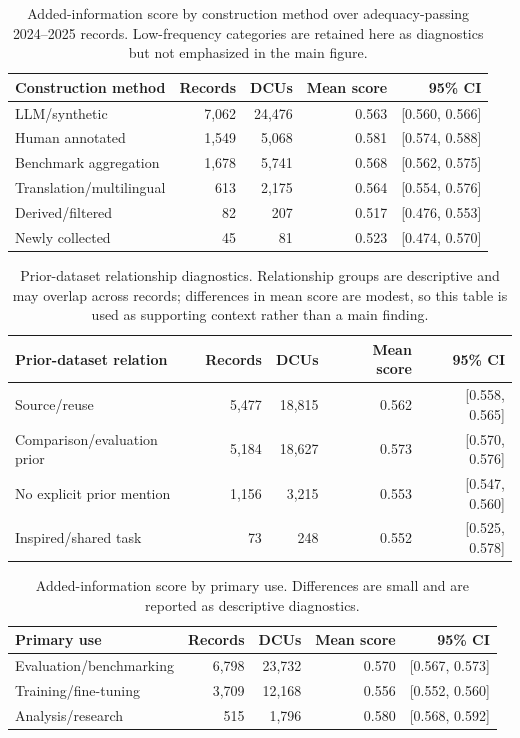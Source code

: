\documentclass[11pt]{article}
\begin{document}
\begin{table}[h]
\centering
\small
\setlength{\tabcolsep}{4pt}
\begin{tabular}{lrrrr}
\toprule
Construction method & Records & DCUs & Mean score & 95\% CI \\
\midrule
LLM/synthetic & 7,062 & 24,476 & 0.563 & [0.560, 0.566] \\
Human annotated & 1,549 & 5,068 & 0.581 & [0.574, 0.588] \\
Benchmark aggregation & 1,678 & 5,741 & 0.568 & [0.562, 0.575] \\
Translation/multilingual & 613 & 2,175 & 0.564 & [0.554, 0.576] \\
Derived/filtered & 82 & 207 & 0.517 & [0.476, 0.553] \\
Newly collected & 45 & 81 & 0.523 & [0.474, 0.570] \\
\bottomrule
\end{tabular}
\caption{Added-information score by construction method over adequacy-passing 2024--2025 records. Low-frequency categories are retained here as diagnostics but not emphasized in the main figure.}
\label{tab:construction_score_appendix}
\end{table}
\begin{table}[h]
\centering
\small
\setlength{\tabcolsep}{4pt}
\begin{tabular}{lrrrr}
\toprule
Prior-dataset relation & Records & DCUs & Mean score & 95\% CI \\
\midrule
Source/reuse & 5,477 & 18,815 & 0.562 & [0.558, 0.565] \\
Comparison/evaluation prior & 5,184 & 18,627 & 0.573 & [0.570, 0.576] \\
No explicit prior mention & 1,156 & 3,215 & 0.553 & [0.547, 0.560] \\
Inspired/shared task & 73 & 248 & 0.552 & [0.525, 0.578] \\
\bottomrule
\end{tabular}
\caption{Prior-dataset relationship diagnostics. Relationship groups are descriptive and may overlap across records; differences in mean score are modest, so this table is used as supporting context rather than a main finding.}
\label{tab:relationship_score_appendix}
\end{table}
\begin{table}[h]
\centering
\small
\setlength{\tabcolsep}{4pt}
\begin{tabular}{lrrrr}
\toprule
Primary use & Records & DCUs & Mean score & 95\% CI \\
\midrule
Evaluation/benchmarking & 6,798 & 23,732 & 0.570 & [0.567, 0.573] \\
Training/fine-tuning & 3,709 & 12,168 & 0.556 & [0.552, 0.560] \\
Analysis/research & 515 & 1,796 & 0.580 & [0.568, 0.592] \\
\bottomrule
\end{tabular}
\caption{Added-information score by primary use. Differences are small and are reported as descriptive diagnostics.}
\label{tab:primary_use_score_appendix}
\end{table}
\end{document}
